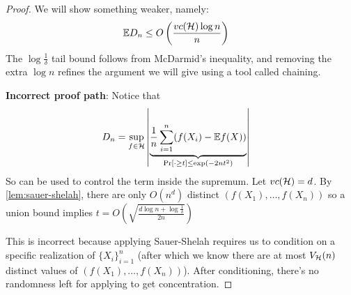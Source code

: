 \begin{proof}
    We will show something weaker, namely:
    \begin{align}
        \mathbb{E} D_n &\leq O\left( \frac{vc(\mathcal{H}) \log n}{n} \right)
    \end{align}
    The $\log \frac{1}{\delta}$ tail bound follows from McDarmid's inequality,
    and removing the extra $\log n$ refines the argument we will give using a tool called chaining.
    
    \textbf{Incorrect proof path}: Notice that
    \begin{align}
        D_n &= \sup_{f \in \mathcal{H}} \left\lvert
            \underbrace{\frac{1}{n} \sum_{i=1}^n (f(X_i) - \mathbb{E} f(X))}_{\Pr[\cdot \geq t] \leq \exp(-2 n t^2)}
        \right\rvert
    \end{align}
    So  can be used to control the term inside the supremum.
    Let $vc(\mathcal{H}) = d$.
    By \cref{lem:sauer-shelah}, there are only $O(n^d)$ distinct $(f(X_1), \ldots, f(X_n))$
    so a union bound implies $t = O\left(\sqrt{\frac{d \log n + \log \frac{1}{\delta}}{2n}}\right)$
    
    This is incorrect because applying Sauer-Shelah requires us to condition on a specific realization of $\{X_i\}_{i=1}^n$
    (after which we know there are at most $V_{\mathcal{H}}(n)$ distinct values of $(f(X_1), \ldots, f(X_n))$).
    After conditioning, there's no randomness left for applying  to get concentration.
    

\end{proof}
